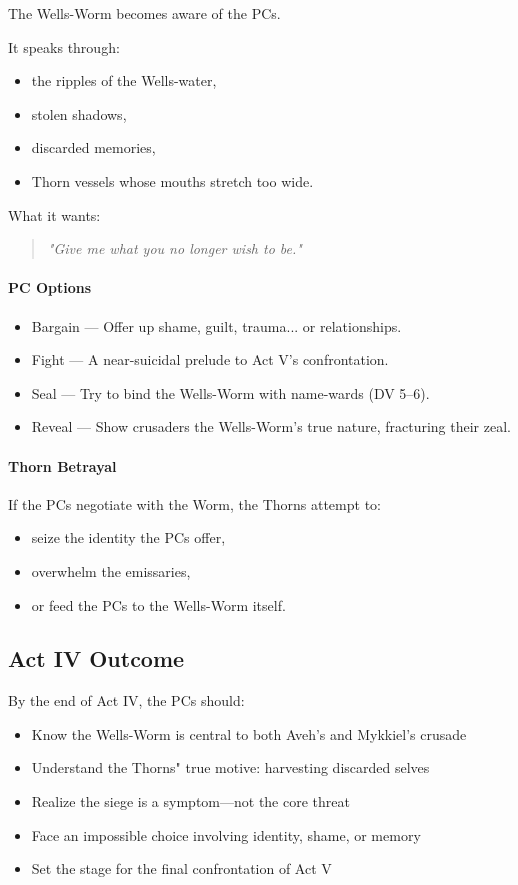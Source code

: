 \documentclass[11pt]{book}
\begin{document}
The Wells-Worm becomes aware of the PCs.

It speaks through:
\begin{itemize}
    \item the ripples of the Wells-water,
    \item stolen shadows,
    \item discarded memories,
    \item Thorn vessels whose mouths stretch too wide.
\end{itemize}

What it wants:
\begin{quote}
\emph{"Give me what you no longer wish to be."}
\end{quote}

\paragraph{PC Options}
\begin{itemize}[leftmargin=*]
    \item Bargain --- Offer up shame, guilt, trauma... or relationships.
    \item Fight --- A near-suicidal prelude to Act V's confrontation.
    \item Seal --- Try to bind the Wells-Worm with name-wards (DV 5--6).
    \item Reveal --- Show crusaders the Wells-Worm's true nature, fracturing their zeal.
\end{itemize}

\paragraph{Thorn Betrayal}
If the PCs negotiate with the Worm, the Thorns attempt to:
\begin{itemize}
    \item seize the identity the PCs offer,
    \item overwhelm the emissaries,
    \item or feed the PCs to the Wells-Worm itself.
\end{itemize}

\subsection*{Act IV Outcome}

By the end of Act IV, the PCs should:
\begin{itemize}[leftmargin=*]
    \item Know the Wells-Worm is central to both Aveh's and Mykkiel's crusade
    \item Understand the Thorns" true motive: harvesting discarded selves
    \item Realize the siege is a symptom---not the core threat
    \item Face an impossible choice involving identity, shame, or memory
    \item Set the stage for the final confrontation of Act V
\end{itemize}
\end{document}
